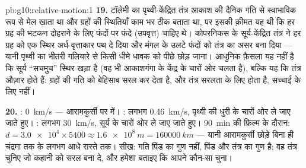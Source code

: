 \begin{solution}{pb:g10:relative-motion:1}
\textbf{19.} टॉलेमी का पृथ्वी-केंद्रित तंत्र आकाश की दैनिक गति से
स्वाभाविक रूप से मेल खाता था और ग्रहों की स्थितियाँ काम भर ठीक बताता था,
पर इसकी क़ीमत यह थी कि हर ग्रह की भटकन दोहराने के लिए फंदों पर फंदे
(उपवृत्त) चाहिए थे। कोपरनिकस के सूर्य-केंद्रित तंत्र ने हर ग्रह को एक
स्थिर अर्ध-वृत्ताकार पथ दे दिया और मंगल के उलटे फंदों को तंत्र का असर
बना दिया --- यानी पृथ्वी का भीतरी गलियारे से किसी धीमे धावक को पीछे छोड़
जाना। आधुनिक फ़ैसला यह नहीं है कि सूर्य ``सचमुच'' स्थिर खड़ा है (वह भी
आकाशगंगा के केंद्र के चारों ओर चलता है), बल्कि यह कि तंत्र औज़ार होते
हैं:  ग्रहों की गति को बेहिसाब सरल कर देता है, और
तंत्र सरलता के लिए होता है, सच्चाई के लिए नहीं।

\textbf{20.} : \qty{0}{km/s} --- आरामकुर्सी पर
 में। : लगभग \qty{0.46}{km/s}, पृथ्वी की
धुरी के चारों ओर ले जाए जाते हुए। : लगभग
\qty{30}{km/s}, सूर्य के चारों ओर ले जाए जाते हुए। \qty{90}{min} की फ़िल्म के दौरान:
$d = \num{3.0e4} \times 5400
\approx \qty{1.6e8}{m} = \qty{160000}{km}$ --- यानी आरामकुर्सी छोड़े बिना ही चंद्रमा तक के लगभग आधे रास्ते
तक। सीख: गति पिंड का गुण नहीं, पिंड और तंत्र का गुण है; वह तंत्र चुनिए
जो कहानी को सरल बना दे, और हमेशा बताइए कि आपने कौन-सा चुना।
\end{solution}

